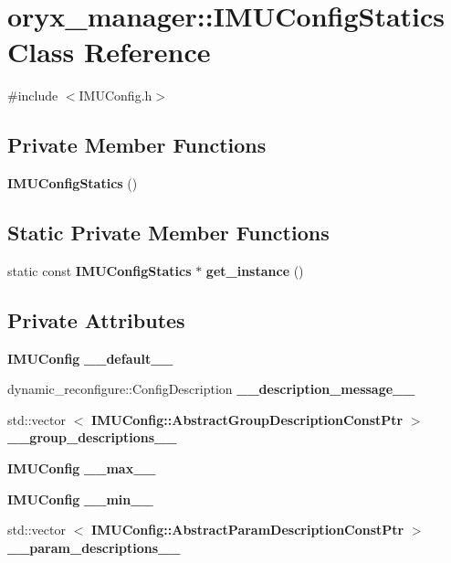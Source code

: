 \section{oryx\-\_\-manager\-:\-:\-I\-M\-U\-Config\-Statics \-Class \-Reference}
\label{classoryx__manager_1_1IMUConfigStatics}


{\ttfamily \#include $<$\-I\-M\-U\-Config.\-h$>$}

\subsection*{\-Private \-Member \-Functions}
\begin{DoxyCompactItemize}
\item 
{\bf \-I\-M\-U\-Config\-Statics} ()
\end{DoxyCompactItemize}
\subsection*{\-Static \-Private \-Member \-Functions}
\begin{DoxyCompactItemize}
\item 
static const {\bf \-I\-M\-U\-Config\-Statics} $\ast$ {\bf get\-\_\-instance} ()
\end{DoxyCompactItemize}
\subsection*{\-Private \-Attributes}
\begin{DoxyCompactItemize}
\item 
{\bf \-I\-M\-U\-Config} {\bf \-\_\-\-\_\-default\-\_\-\-\_\-}
\item 
dynamic\-\_\-reconfigure\-::\-Config\-Description {\bf \-\_\-\-\_\-description\-\_\-message\-\_\-\-\_\-}
\item 
std\-::vector\*
$<$ {\bf \-I\-M\-U\-Config\-::\-Abstract\-Group\-Description\-Const\-Ptr} $>$ {\bf \-\_\-\-\_\-group\-\_\-descriptions\-\_\-\-\_\-}
\item 
{\bf \-I\-M\-U\-Config} {\bf \-\_\-\-\_\-max\-\_\-\-\_\-}
\item 
{\bf \-I\-M\-U\-Config} {\bf \-\_\-\-\_\-min\-\_\-\-\_\-}
\item 
std\-::vector\*
$<$ {\bf \-I\-M\-U\-Config\-::\-Abstract\-Param\-Description\-Const\-Ptr} $>$ {\bf \-\_\-\-\_\-param\-\_\-descriptions\-\_\-\-\_\-}
\end{DoxyCompactItemize}
